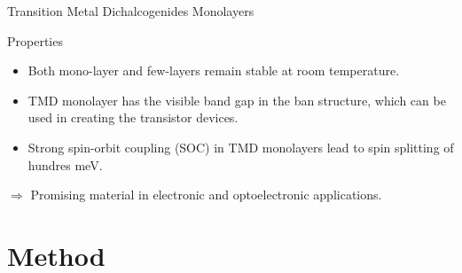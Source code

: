 \documentclass[aspectratio=169,compress,x11names]{beamer}
\begin{document}
	\begin{frame}{Transition Metal Dichalcogenides Monolayers}
		\begin{block}{Properties}
			\begin{itemize}
				\item Both mono-layer and few-layers remain stable at room temperature.
				\item TMD monolayer has the visible band gap in the ban structure, which can be used in creating the transistor devices\footnotemark.
				\item  Strong spin-orbit coupling (SOC) in TMD monolayers lead to spin splitting of hundres meV.
			\end{itemize}
		\end{block}
		$\Rightarrow$ Promising material in electronic and optoelectronic applications.
	\end{frame}
	\section{Method}
\end{document}
